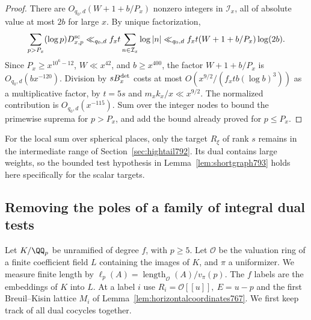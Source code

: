 \documentclass[a4paper,11pt]{article}
\theoremstyle{definition}
\theoremstyle{remark}
\numberwithin{equation}{section}
\begin{document}
\begin{proof}
There are \(O_{q_0,d}(W+1+b/P_x)\) nonzero integers in
\(\mathcal I_x\), all of absolute value at most \(2b\) for
large \(x\). By unique factorization,
\[
  \sum_{p>P_x}(\log p) D^{\rm sc}_{x,p}
   \ll_{q_0,d} f_x t\sum_{n\in\mathcal I_x}\log |n|
   \ll_{q_0,d} f_x t(W+1+b/P_x)\log(2b).
\]
Since \(P_x\ge x^{10^6-12}\), \(W\ll x^{42}\), and
\(b\ge x^{400}\), the factor \(W+1+b/P_x\) is
\(O_{q_0,d}(b x^{-120})\). Division by \(sB_x^{\rm det}\)
costs at most \(O(x^{9/2}/(f_x t b(\log b)^3))\) as a
multiplicative factor, by \(t=5s\) and \(m_xk_x/x\ll x^{9/2}\).
The normalized contribution is \(O_{q_0,d}(x^{-115})\).
Sum over the integer nodes to bound the primewise suprema
for \(p>P_x\), and add the bound already proved for
\(p\le P_x\).
\end{proof}
For the local sum over spherical places, only the target
\(R_\xi\) of rank \(s\) remains in the intermediate range
of Section~\ref{sec:hightail792}. Its dual contains large
weights, so the bounded test hypothesis in
Lemma~\ref{lem:shortgraph793} holds here specifically for
the scalar targets.
\clearpage

\subsection{Removing the poles of a family of integral dual tests}
\label{sec:rankpoles794}
Let \(K/\QQ_p\) be unramified of degree \(f\), with \(p\ge5\).
Let \(\mathcal O\) be the valuation ring of a finite coefficient
field \(L\) containing the images of \(K\), and \(\pi\) a uniformizer.
We measure finite length by
\(\ell_p(A)=\operatorname{length}_{\mathcal O}(A)/v_\pi(p)\).
The \(f\) labels are the embeddings of \(K\) into \(L\).
At a label \(i\) use \(R_i=\mathcal O[[u]],\ E=u-p\) and the
first Breuil--Kisin lattice \(M_i\) of
Lemma~\ref{lem:horizontalcoordinates767}. We first keep track
of all dual cocycles together.
\end{document}
